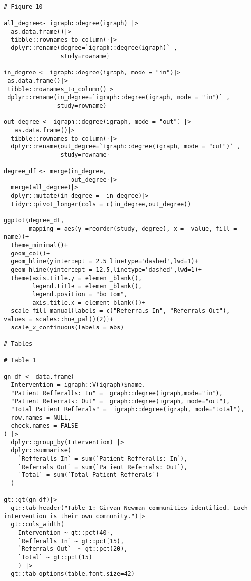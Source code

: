 \begin{verbatim}
# Figure 10

all_degree<- igraph::degree(igraph) |> 
  as.data.frame()|>
  tibble::rownames_to_column()|>
  dplyr::rename(degree=`igraph::degree(igraph)` ,
                study=rowname)

in_degree <- igraph::degree(igraph, mode = "in")|>
 as.data.frame()|>
 tibble::rownames_to_column()|>
 dplyr::rename(in_degree=`igraph::degree(igraph, mode = "in")` ,
               study=rowname)

out_degree <- igraph::degree(igraph, mode = "out") |>
   as.data.frame()|>
  tibble::rownames_to_column()|>
  dplyr::rename(out_degree=`igraph::degree(igraph, mode = "out")` ,
                study=rowname)

degree_df <- merge(in_degree,
                   out_degree)|>
  merge(all_degree)|>
  dplyr::mutate(in_degree = -in_degree)|>
  tidyr::pivot_longer(cols = c(in_degree,out_degree))

ggplot(degree_df,
       mapping = aes(y =reorder(study, degree), x = -value, fill = name))+
  theme_minimal()+
  geom_col()+
  geom_hline(yintercept = 2.5,linetype='dashed',lwd=1)+
  geom_hline(yintercept = 12.5,linetype='dashed',lwd=1)+
  theme(axis.title.y = element_blank(),
        legend.title = element_blank(),
        legend.position = "bottom",
        axis.title.x = element_blank())+
  scale_fill_manual(labels = c("Referrals In", "Referrals Out"), values = scales::hue_pal()(2))+
  scale_x_continuous(labels = abs)

# Tables

# Table 1

gn_df <- data.frame(
  Intervention = igraph::V(igraph)$name,
  "Patient Refferalls: In" = igraph::degree(igraph,mode="in"),
  "Patient Referrals: Out" = igraph::degree(igraph, mode="out"),
  "Total Patient Refferals" =  igraph::degree(igraph, mode="total"),
  row.names = NULL,
  check.names = FALSE
) |>
  dplyr::group_by(Intervention) |> 
  dplyr::summarise(
    `Refferalls In` = sum(`Patient Refferalls: In`),
    `Referrals Out` = sum(`Patient Referrals: Out`),
    `Total` = sum(`Total Patient Refferals`)
  )

gt::gt(gn_df)|>
  gt::tab_header("Table 1: Girvan-Newman communities identified. Each intervention is their own community.")|>
  gt::cols_width(
    Intervention ~ gt::pct(40),
    `Refferalls In` ~ gt::pct(15),
    `Referrals Out`  ~ gt::pct(20),
    `Total` ~ gt::pct(15)
    ) |>
  gt::tab_options(table.font.size=42)




\end{verbatim}

